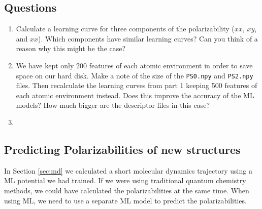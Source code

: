 \documentclass{article}
\begin{document}
\subsection*{Questions}

\begin{enumerate}

\item Calculate a learning curve for three components of the polarizability ($xx$, $xy$, and $xx$). Which components have similar learning curves? Can you think of a reason why this might be the case?
\item We have kept only 200 features of each atomic environment in order to save space on our hard disk. Make a note of the size of the \verb|PS0.npy| and \verb|PS2.npy| files. Then recalculate the learning curves from part 1 keeping 500 features of each atomic environment instead. Does this improve the accuracy of the ML models? How much bigger are the descriptor files in this case?
\item

\end{enumerate}

\subsection*{Predicting Polarizabilities of new structures}

In Section \ref{sec:md} we calculated a short molecular dynamics trajectory using a ML potential we had trained. If we were using traditional quantum chemistry methods, we could have calculated the polarizabilities at the same time. When using ML, we need to use a separate ML model to predict the polarizabilities.
\end{document}
